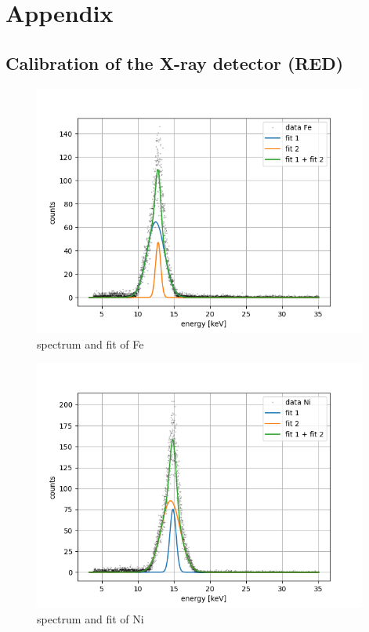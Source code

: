 \chapter{Appendix}
\section{Calibration of the X-ray detector (RED)}
\label{appendix:calib}
\begin{figure}[H]
    \centering
    \includegraphics[width=110mm,scale=0.5]{MAX/include/plotsFe.png}
    \caption{spectrum and fit of Fe}
\end{figure}
\begin{figure}[H]
    \centering
    \includegraphics[width=110mm,scale=0.5]{MAX/include/plotsNi.png}
    \caption{spectrum and fit of Ni}
\end{figure}
